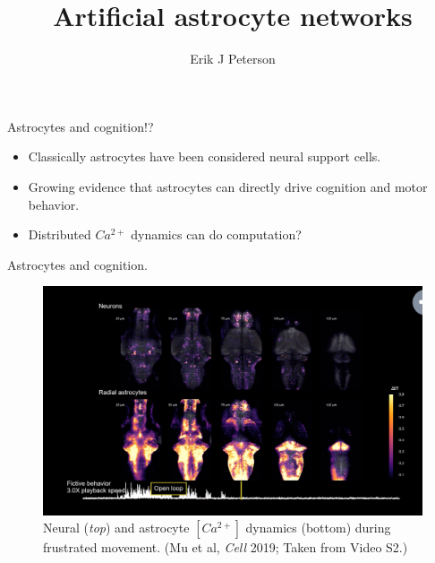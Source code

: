 \documentclass[10pt]{beamer}
\title{Artificial astrocyte networks}
\date{}
\author{Erik J Peterson}
\institute{CoAxLab\\Carnegie Mellon University}
\begin{document}
\maketitle


\begin{frame}[fragile]{Astrocytes and cognition!?}
\begin{itemize}
    \item Classically astrocytes have been considered neural support cells.
    \item Growing evidence that astrocytes can directly drive cognition and motor behavior.
    \item \alert{Distributed $Ca^{2+}$ dynamics can do computation?}
\end{itemize}
\end{frame}

\begin{frame}[fragile]{Astrocytes and cognition.}
\begin{figure}
    \centering
    \includegraphics[scale=0.45]{images/mu.png} 
    \caption{Neural (\textit{top}) and astrocyte $[Ca^{2+}]$ dynamics (bottom) during frustrated movement. (Mu et al, \textit{Cell} 2019; Taken from Video S2.)}
\end{figure}
\end{frame}
\end{document}

